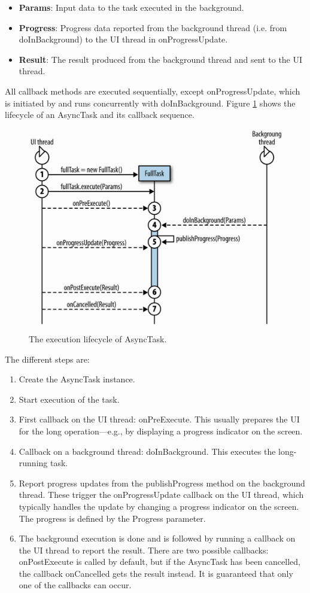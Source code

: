 \begin{itemize}
	\item \textbf{Params}: Input data to the task executed in the background.
	\item \textbf{Progress}: Progress data reported from the background thread (i.e. from doInBackground) to the UI thread in onProgressUpdate.
	\item \textbf{Result}: The result produced from the background thread and sent to the UI thread.
\end{itemize}
All callback methods are executed sequentially, except onProgressUpdate, which is initiated by and runs concurrently with doInBackground. Figure \ref{fig7.3} shows the lifecycle of an AsyncTask and its callback sequence.
\begin{figure}[ht!]
	\centering
	\includegraphics[width=120mm]{figures/ch7/3.png}
	\caption{The execution lifecycle of AsyncTask.}
	\label{fig7.3}
\end{figure}
The different steps are:
\begin{enumerate}
	\item Create the AsyncTask instance.
	\item Start execution of the task.
	\item First callback on the UI thread: onPreExecute. This usually prepares the UI for the long operation—e.g., by displaying a progress indicator on the screen.
	\item Callback on a background thread: doInBackground. This executes the long-running task.
	\item Report progress updates from the publishProgress method on the background thread. These trigger the onProgressUpdate callback on the UI thread, which typically handles the update by changing a progress indicator on the screen. The progress is defined by the Progress parameter.
	\item The background execution is done and is followed by running a callback on the UI thread to report the result. There are two possible callbacks: onPostExecute is called by default, but if the AsyncTask has been cancelled, the callback onCancelled gets the result instead. It is guaranteed that only one of the callbacks can occur.
\end{enumerate}
